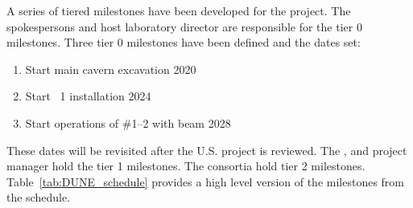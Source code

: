A series of tiered milestones have been developed for the 
project. The spokespersons and host laboratory director are
responsible for the tier 0 milestones. Three tier 0 milestones have
been defined and the dates set:
\begin{enumerate}
\item Start main cavern excavation \hspace{2.58in} 2020
\item Start ~1 installation \hspace{2.1in} 2024
\item Start operations of  \#1--2 with beam \hspace{0.8in} 2028
\end{enumerate}
These dates will be revisited after the U.S.  project is
reviewed. The ,  and  project
manager hold the tier 1 milestones.  The consortia hold tier 2
milestones. Table~\ref{tab:DUNE_schedule} provides a high level version of the
 milestones from the  schedule.

